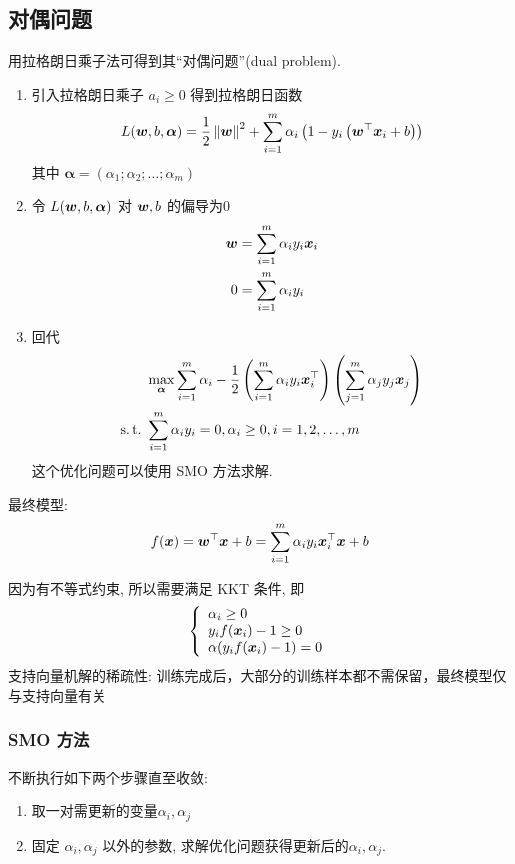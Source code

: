 \subsection{对偶问题}
用拉格朗日乘子法可得到其“对偶问题”(dual problem). 
\begin{enumerate}
    \item 引入拉格朗日乘子 $a_i\ge 0$ 得到拉格朗日函数
    \begin{align*}
        L(\bm{w}, b, \bm \alpha)=\frac{1}{2}\left\lVert\bm{w}\right\rVert^2+\sum_{i=1}^m\alpha_i\left( 1-y_i\left( \bm{w}^\top \bm{x}_i+b \right) \right)
    \end{align*}
    其中 $\bm\alpha = (\alpha_1;\alpha_2;\dots;\alpha_m)$
    \item 令 $L(\bm{w}, b, \bm \alpha)$ 对 $\bm{w}, b$ 的偏导为0
    \begin{align*}
        \bm{w} &= \sum_{i=1}^m\alpha_i y_i\bm{x}_i \\
        0&=\sum_{i=1}^m\alpha_i y_i
    \end{align*}
    \item 回代
    \begin{align*}
        &\max_{\bm\alpha}\sum_{i=1}^m\alpha_i-\frac{1}{2}\left( \sum_{i=1}^m \alpha_i y_i\bx_i^\top\right)\left( \sum_{j=1}^m \alpha_j y_j\bx_j \right)\\
        \st&\sum_{i=1}^m\alpha_i y_i=0, \alpha_i\ge0, i=1,2,\dots,m
    \end{align*}
    这个优化问题可以使用 SMO 方法求解. 
\end{enumerate}
最终模型:
\begin{align*}
    f(\bm{x})=\bm{w}^\top\bm{x}+b=\sum_{i=1}^m\alpha_iy_i\bm{x}_i^\top\bm{x}+b
\end{align*}

因为有不等式约束, 所以需要满足 KKT 条件, 即
\begin{align*}
    \left\{ \begin{array}{l}
        \alpha_i\ge0\\
        y_if(\bm{x}_i)-1\ge0\\
        \alpha(y_if(\bm{x}_i)-1)=0
    \end{array} \right.
\end{align*}
支持向量机解的稀疏性: 训练完成后，大部分的训练样本都不需保留，最终模型仅与支持向量有关

\subsubsection{SMO 方法}%
不断执行如下两个步骤直至收敛:
\begin{enumerate}
    \item 取一对需更新的变量$\alpha_i,\alpha_j$
    \item 固定 $\alpha_i,\alpha_j$ 以外的参数, 求解优化问题获得更新后的$\alpha_i,\alpha_j$.
\end{enumerate}

